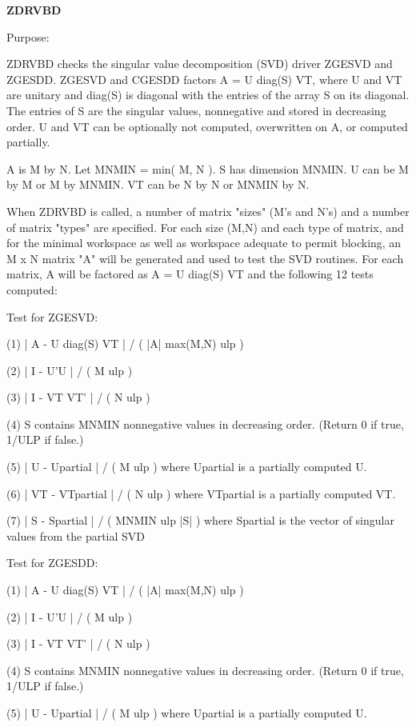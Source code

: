 {\bfseries Z\+D\+R\+V\+B\+D} 

\begin{DoxyParagraph}{Purpose\+: }
\begin{DoxyVerb} ZDRVBD checks the singular value decomposition (SVD) driver ZGESVD
 and ZGESDD.
 ZGESVD and CGESDD factors A = U diag(S) VT, where U and VT are
 unitary and diag(S) is diagonal with the entries of the array S on
 its diagonal. The entries of S are the singular values, nonnegative
 and stored in decreasing order.  U and VT can be optionally not
 computed, overwritten on A, or computed partially.

 A is M by N. Let MNMIN = min( M, N ). S has dimension MNMIN.
 U can be M by M or M by MNMIN. VT can be N by N or MNMIN by N.

 When ZDRVBD is called, a number of matrix "sizes" (M's and N's)
 and a number of matrix "types" are specified.  For each size (M,N)
 and each type of matrix, and for the minimal workspace as well as
 workspace adequate to permit blocking, an  M x N  matrix "A" will be
 generated and used to test the SVD routines.  For each matrix, A will
 be factored as A = U diag(S) VT and the following 12 tests computed:

 Test for ZGESVD:

 (1)   | A - U diag(S) VT | / ( |A| max(M,N) ulp )

 (2)   | I - U'U | / ( M ulp )

 (3)   | I - VT VT' | / ( N ulp )

 (4)   S contains MNMIN nonnegative values in decreasing order.
       (Return 0 if true, 1/ULP if false.)

 (5)   | U - Upartial | / ( M ulp ) where Upartial is a partially
       computed U.

 (6)   | VT - VTpartial | / ( N ulp ) where VTpartial is a partially
       computed VT.

 (7)   | S - Spartial | / ( MNMIN ulp |S| ) where Spartial is the
       vector of singular values from the partial SVD

 Test for ZGESDD:

 (1)   | A - U diag(S) VT | / ( |A| max(M,N) ulp )

 (2)   | I - U'U | / ( M ulp )

 (3)   | I - VT VT' | / ( N ulp )

 (4)   S contains MNMIN nonnegative values in decreasing order.
       (Return 0 if true, 1/ULP if false.)

 (5)   | U - Upartial | / ( M ulp ) where Upartial is a partially
       computed U.


\end{DoxyVerb}
\end{DoxyParagraph}
